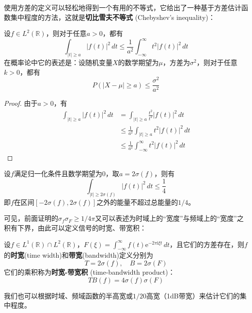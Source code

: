 使用方差的定义可以轻松地得到一个有用的不等式，它给出了一种基于方差估计函数集中程度的方法，这就是\textbf{切比雪夫不等式} (Chebyshev's inequality)：
\begin{theorem}[切比雪夫不等式]
    设$f\in L^2(\mathbb{R} )$，则对于任意$a>0$，都有
    \[\int_{|t|\geq a}|f(t)|^2\,dt\leq \frac{1}{a^2}\int_{-\infty}^{\infty}t^2|f(t)|^2\,dt\]
    在概率论中它的表述是：设随机变量$X$的数学期望为$\mu$，方差为$\sigma^2$，则对于任意$k>0$，都有\[P(|X-\mu|\geq a)\leq \frac{\sigma^2}{a^2}\]
\end{theorem}
\begin{proof}
    由于$a>0$，有
    \begin{align*}
        \int_{|t|\geq a}|f(t)|^2\,dt & =\int_{|t|\geq a}\frac{t^2}{t^2}|f(t)|^2\,dt             \\
                                     & \leq \frac{1}{a^2}\int_{|t|\geq a}t^2|f(t)|^2\,dt        \\
                                     & \leq \frac{1}{a^2}\int_{-\infty}^{\infty}t^2|f(t)|^2\,dt
    \end{align*}
\end{proof}

\begin{example}
    设$f$满足归一化条件且数学期望为0，取$a=2\sigma(f)$，则有\[\int_{|t|\geq 2\sigma(f)}|f(t)|^2\,dt\leq \frac{1}{4}\]
    即$f$在区间$[-2\sigma(f),2\sigma(f)]$之外的能量不超过总能量的$1/4$。
\end{example}
可见，前面证明的$\sigma_f \sigma_F\geq 1/4\pi$又可以表述为时域上的“宽度”与频域上的“宽度”之积有下界，由此可以定义信号的时宽、带宽积：
\begin{definition}[时宽-带宽积]
    设$f\in L^1(\mathbb{R} )\cap L^2(\mathbb{R} )$，$F(\xi)=\int_{-\infty}^{\infty}f(t)\mathrm{e}^{-2\pi \mathrm{i}\xi t}\,dt$，且它们的方差存在，则$f$的\textbf{时宽}(time width)和\textbf{带宽}(bandwidth)定义分别为
    \[T=2\sigma(f),\quad B=2\sigma(F)\]
    它们的乘积称为\textbf{时宽-带宽积} (time-bandwidth product)：
    \[TB(f)=4\sigma(f)\sigma(F)\]
\end{definition}

我们也可以根据时域、频域函数的半高宽或$1/20$高宽（1dB带宽）来估计它们的集中程度。

